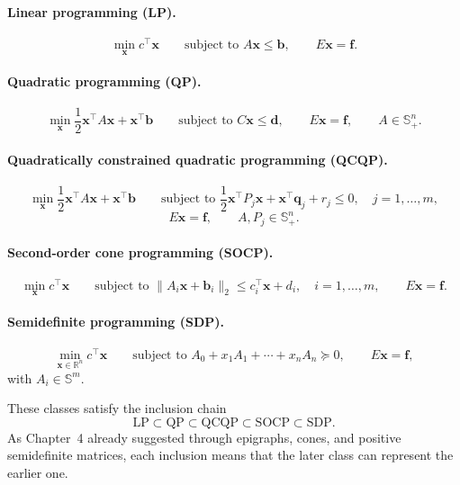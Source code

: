 \paragraph{Linear programming (LP).}
\[
  \min_{\mathbf{x}} c^\top \mathbf{x}
  \qquad
  \text{subject to }
  A\mathbf{x}\le \mathbf{b},
  \qquad
  E\mathbf{x}=\mathbf{f}.
\]

\paragraph{Quadratic programming (QP).}
\[
  \min_{\mathbf{x}}
  \frac12 \mathbf{x}^\top A \mathbf{x} + \mathbf{x}^\top \mathbf{b}
  \qquad
  \text{subject to }
  C\mathbf{x}\le \mathbf{d},
  \qquad
  E\mathbf{x}=\mathbf{f},
  \qquad
  A\in \mathbb{S}_+^n.
\]

\paragraph{Quadratically constrained quadratic programming (QCQP).}
\[
  \min_{\mathbf{x}}
  \frac12 \mathbf{x}^\top A \mathbf{x} + \mathbf{x}^\top \mathbf{b}
  \qquad
  \text{subject to }
  \frac12 \mathbf{x}^\top P_j \mathbf{x}
  + \mathbf{x}^\top \mathbf{q}_j + r_j \le 0,
  \quad j=1,\dots,m,
\]
\[
  E\mathbf{x}=\mathbf{f},
  \qquad
  A,P_j\in \mathbb{S}_+^n.
\]

\paragraph{Second-order cone programming (SOCP).}
\[
  \min_{\mathbf{x}} c^\top \mathbf{x}
  \qquad
  \text{subject to }
  \|A_i\mathbf{x}+\mathbf{b}_i\|_2 \le c_i^\top \mathbf{x} + d_i,
  \quad i=1,\dots,m,
  \qquad
  E\mathbf{x}=\mathbf{f}.
\]

\paragraph{Semidefinite programming (SDP).}
\[
  \min_{\mathbf{x}\in \mathbb{R}^n} c^\top \mathbf{x}
  \qquad
  \text{subject to }
  A_0 + x_1 A_1 + \cdots + x_n A_n \succeq 0,
  \qquad
  E\mathbf{x}=\mathbf{f},
\]
with $A_i\in \mathbb{S}^m$.

These classes satisfy the inclusion chain
\[
  \mathrm{LP} \subset \mathrm{QP} \subset \mathrm{QCQP}
  \subset \mathrm{SOCP} \subset \mathrm{SDP}.
\]
As Chapter~4 already suggested through epigraphs, cones, and positive
semidefinite matrices, each inclusion means that the later class can represent
the earlier one.

